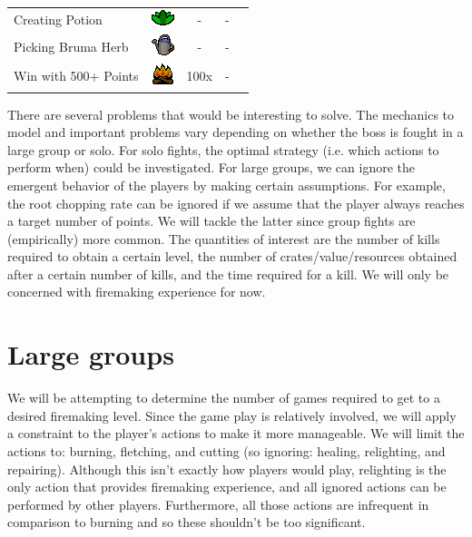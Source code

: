 \begin{table}[H]
\begin{tabular}{lcccc}
		Creating Potion                     & \includegraphics[width=0.03\linewidth]{img/general/skills/Herblore_icon.png}     & -                      & -               \\
		Picking Bruma Herb                  & \includegraphics[width=0.03\linewidth]{img/general/skills/Farming_icon.png}      & -                      & -               \\
		Win with 500+ Points                & \includegraphics[width=0.03\linewidth]{img/general/skills/Firemaking_icon.png}   & 100x                   & -              
	\end{tabular}
	\label{table:wintertodt_actions}
\end{table}

There are several problems that would be interesting to solve. The mechanics to model and important problems vary depending on whether the boss is fought in a large group or solo. For solo fights, the optimal strategy (i.e. which actions to perform when) could be investigated. For large groups, we can ignore the emergent behavior of the players by making certain assumptions. For example, the root chopping rate can be ignored if we assume that the player always reaches a target number of points. We will tackle the latter since group fights are (empirically) more common. The quantities of interest are the number of kills required to obtain a certain level, the number of crates/value/resources obtained after a certain number of kills, and the time required for a kill. We will only be concerned with firemaking experience for now.

\section{Large groups}
	We will be attempting to determine the number of games required to get to a desired firemaking level. Since the game play is relatively involved, we will apply a constraint to the player's actions to make it more manageable. We will limit the actions to: burning, fletching, and cutting (so ignoring: healing, relighting, and repairing). Although this isn't exactly how players would play, relighting is the only action that provides firemaking experience, and all ignored actions can be performed by other players. Furthermore, all those actions are infrequent in comparison to burning and so these shouldn't be too significant.

